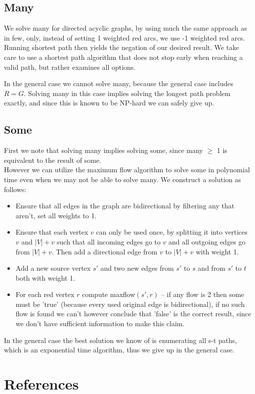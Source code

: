 \documentclass{tufte-handout}
\begin{document}
\subsection{Many}
We solve many for directed acyclic graphs,
by using much the same approach as in few,
only, instead of setting 1 weighted red arcs,
we use -1 weighted red arcs.
Running shortest path then yields the negation
of our desired result.
We take care to use a shortest path algorithm
that does not stop early when reaching a valid path,
but rather examines all options.

In the general case we cannot solve many,
because the general case includes $R = G$.
Solving many in this case implies solving 
the longest path problem exactly, 
and since this is known to be NP-hard
we can safely give up. %

\subsection{Some}
First we note that solving many implies solving some,
since many $\ge$ 1 is equivalent to the result of some. \\

However we can utilize the maximum flow algorithm to solve
some in polynomial time even when we may not be able to solve many.
We construct a solution as follows:
\begin{itemize}
  \item Ensure that all edges in the graph are bidirectional by filtering any that aren't, set all weights to 1.
  \item Ensure that each vertex $v$ can only be used once, by splitting it into vertices $v$ and $|V|+v$ such that all incoming edges go to
  $v$ and all outgoing edges go from $|V|+v$. Then add a directional edge from $v$ to $|V|+v$ with weight 1.
  \item Add a new source vertex $s'$ and two new edges from $s'$ to $s$ and from $s'$ to $t$ both with weight 1.
  \item For each red vertex $r$ compute maxflow$(s', r)$ -- if any flow is 2 then some must be 'true' 
  (because every used original edge is bidirectional),
  if no such flow is found we can't however 
  conclude that 'false' is the correct result, since we don't have sufficient information to make this claim.
\end{itemize}

In the general case the best solution we know of is 
enumerating all s-t paths, which is an exponential time algorithm,
thus we give up in the general case.


\section{References}
\begin{description}

\end{description}
\end{document}

